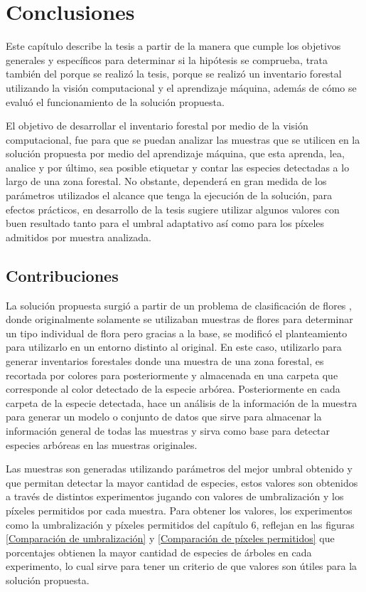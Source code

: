 \chapter{Conclusiones}
Este capítulo describe la tesis a partir de la manera que cumple los objetivos generales y específicos para determinar si la hipótesis se comprueba, trata también del porque se realizó la tesis, porque se realizó un inventario forestal utilizando la visión computacional y el aprendizaje máquina, además de cómo se evaluó el funcionamiento de la solución propuesta.

El objetivo de desarrollar el inventario forestal por medio de la visión computacional, fue para que se puedan analizar las muestras que se utilicen en la solución propuesta por medio del aprendizaje máquina, que esta aprenda, lea, analice y por último, sea posible etiquetar y contar las especies detectadas a lo largo de una zona forestal. No obstante, dependerá en gran medida de los parámetros utilizados el alcance que tenga la ejecución de la solución, para efectos prácticos, en desarrollo de la tesis sugiere utilizar algunos valores con buen resultado tanto para el umbral adaptativo así como para los píxeles admitidos por muestra analizada.

\clearpage

\section{Contribuciones}
La solución propuesta surgió a partir de un problema de clasificación de flores \citep{rf17},  donde originalmente solamente se utilizaban muestras de flores para determinar un tipo individual de flora pero gracias a la base, se modificó el planteamiento para utilizarlo en un entorno distinto al original. En este caso, utilizarlo para generar inventarios forestales donde una muestra de una zona forestal, es recortada por colores para posteriormente y almacenada en una carpeta que corresponde al color detectado de la especie arbórea. Posteriormente en cada carpeta de la especie detectada, hace un análisis de la información de la muestra para generar un modelo  o conjunto de datos que sirve para almacenar la información general de todas las muestras y sirva como base para detectar especies arbóreas en las muestras originales. 

Las muestras son generadas utilizando parámetros del mejor umbral obtenido y que permitan detectar la mayor cantidad de especies, estos valores son obtenidos a través de distintos experimentos jugando con valores de umbralización y los píxeles permitidos por cada muestra. Para obtener los valores, los experimentos como la umbralización y píxeles permitidos del capítulo 6, reflejan en las figuras \ref{Comparación de umbralización} y \ref{Comparación de píxeles permitidos} que porcentajes obtienen la mayor cantidad de especies de árboles en cada experimento, lo cual sirve para tener un criterio de que valores son útiles para la solución propuesta.

